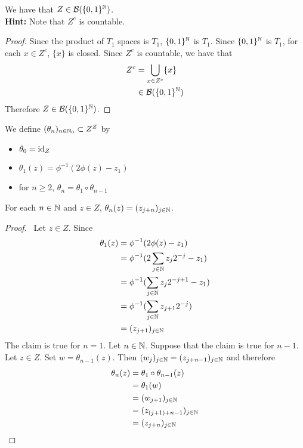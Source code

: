 \documentclass{book}
\begin{document}
	\begin{ex}  
		We have that $Z \in \mathcal{B}(\{0,1\}^{\mathbb{N}})$. \\
		\textbf{Hint:} Note that $Z^c$ is countable. 
	\end{ex}
	
	\begin{proof}
		Since the product of $T_1$ spaces is $T_1$, $\{0,1\}^{\mathbb{N}}$ is $T_1$. Since $\{0,1\}^{\mathbb{N}}$ is $T_1$, for each $x \in Z^c$, $\{x \}$ is closed. Since $Z^c$ is countable, we have that 
		\begin{align*}
			Z^c
			& = \bigcup_{x \in  Z^c} \{x\} \\
			& \in  \mathcal{B}(\{0,1\}^{\mathbb{N}})
		\end{align*} 
		Therefore $Z \in  \mathcal{B}(\{0,1\}^{\mathbb{N}})$.
	\end{proof}
	
	\begin{defn}  
		We define $(\theta_n)_{n \in \mathbb{N}_0} \subset Z^Z$ by
		\begin{itemize}
			\item 	$\theta_0 = \operatorname{id}_Z$
			\item $\theta_1 (z) = \phi^{-1}(2 \phi(z) - z_1)$ 
			\item for $n \geq 2$, $\theta_n = \theta_1 \circ \theta_{n-1}$
		\end{itemize}
	\end{defn}
	
	\begin{ex}  
		For each $n \in \mathbb{N}$ and $z \in Z$, $\theta_n(z) = (z_{j+n})_{j \in \mathbb{N}}$.
	\end{ex}
	
	\begin{proof} \
		Let $z \in Z$. Since  
		\begin{align*}
			\theta_1(z) 
			& = \phi^{-1}(2 \phi(z) - z_1) \\
			& = \phi^{-1}(2 \sum_{j \in \mathbb{N}} z_j2^{-j} - z_1) \\
			& = \phi^{-1}(\sum_{j \in \mathbb{N}} z_j2^{-j+1} - z_1) \\
			& = \phi^{-1}(\sum_{j \in \mathbb{N}} z_{j+1}2^{-j}) \\
			& = (z_{j+1})_{j \in \mathbb{N}}
		\end{align*}
		The claim is true for $n =1$. Let $n \in \mathbb{N}$. Suppose that the claim is true for $n-1$. Let $z \in Z$. Set $w = \theta_{n-1}(z)$. Then $(w_{j})_{j \in \mathbb{N}} = (z_{j+n -1})_{j \in \mathbb{N}}$ and therefore
		\begin{align*}
			\theta_n(z) 
			& = \theta_1 \circ \theta_{n-1} (z) \\
			& = \theta_1 (w) \\
			& = (w_{j + 1})_{j \in \mathbb{N}} \\
			& = (z_{(j+ 1) +  n-1} )_{j \in \mathbb{N}} \\
			& = (z_{j+  n })_{j \in \mathbb{N}}
		\end{align*}
	\end{proof}
	
\end{document}
